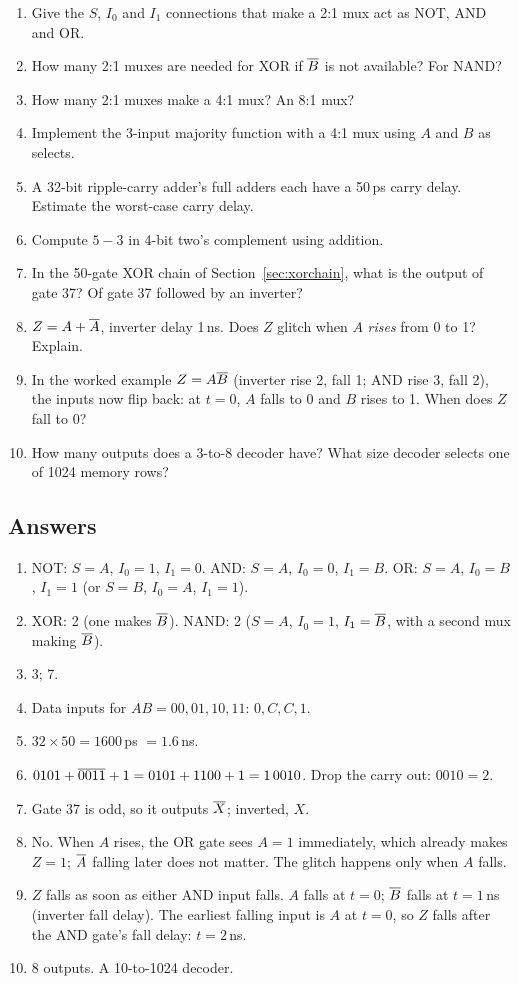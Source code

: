 \begin{enumerate}
  \item Give the $S$, $I_0$ and $I_1$ connections that make a 2:1 mux act as NOT, AND and OR.
  \item How many 2:1 muxes are needed for XOR if $\overline{B}$ is not available? For NAND?
  \item How many 2:1 muxes make a 4:1 mux? An 8:1 mux?
  \item Implement the 3-input majority function with a 4:1 mux using $A$ and $B$ as selects.
  \item A 32-bit ripple-carry adder's full adders each have a 50\,ps carry delay. Estimate the worst-case carry delay.
  \item Compute $5 - 3$ in 4-bit two's complement using addition.
  \item In the 50-gate XOR chain of Section~\ref{sec:xorchain}, what is the output of gate 37? Of gate 37 followed by an inverter?
  \item $Z = A + \overline{A}$, inverter delay 1\,ns. Does $Z$ glitch when $A$ \emph{rises} from 0 to 1? Explain.
  \item In the worked example $Z = A\overline{B}$ (inverter rise 2, fall 1; AND rise 3, fall 2), the inputs now flip back: at $t = 0$, $A$ falls to 0 and $B$ rises to 1. When does $Z$ fall to 0?
  \item How many outputs does a 3-to-8 decoder have? What size decoder selects one of 1024 memory rows?
\end{enumerate}

\subsection*{Answers}
\begin{enumerate}
  \item NOT: $S = A$, $I_0 = 1$, $I_1 = 0$. AND: $S = A$, $I_0 = 0$, $I_1 = B$. OR: $S = A$, $I_0 = B$, $I_1 = 1$ (or $S = B$, $I_0 = A$, $I_1 = 1$).
  \item XOR: 2 (one makes $\overline{B}$). NAND: 2 ($S = A$, $I_0 = 1$, $I_1 = \overline{B}$, with a second mux making $\overline{B}$).
  \item 3; 7.
  \item Data inputs for $AB = 00, 01, 10, 11$: $0, C, C, 1$.
  \item $32 \times 50 = 1600$\,ps $= 1.6$\,ns.
  \item $0101 + \overline{0011} + 1 = 0101 + 1100 + 1 = 1\,0010$. Drop the carry out: $0010 = 2$.
  \item Gate 37 is odd, so it outputs $\overline{X}$; inverted, $X$.
  \item No. When $A$ rises, the OR gate sees $A = 1$ immediately, which already makes $Z = 1$; $\overline{A}$ falling later does not matter. The glitch happens only when $A$ falls.
  \item $Z$ falls as soon as either AND input falls. $A$ falls at $t = 0$; $\overline{B}$ falls at $t = 1$\,ns (inverter fall delay). The earliest falling input is $A$ at $t = 0$, so $Z$ falls after the AND gate's fall delay: $t = 2$\,ns.
  \item 8 outputs. A 10-to-1024 decoder.
\end{enumerate}
